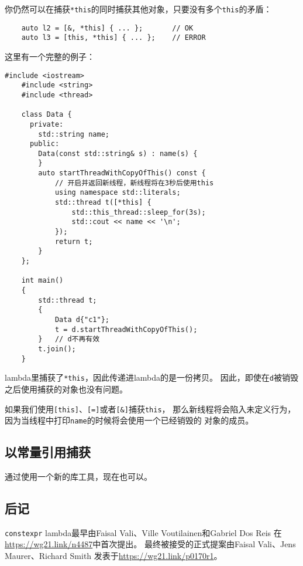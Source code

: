 你仍然可以在捕获\texttt{*this}的同时捕获其他对象，只要没有多个\texttt{this}的矛盾：
\begin{lstlisting}
    auto l2 = [&, *this] { ... };       // OK
    auto l3 = [this, *this] { ... };    // ERROR
\end{lstlisting}
这里有一个完整的例子：
\begin{lstlisting}[frame=single, title=lang/lambdathis.cpp]
    #include <iostream>
    #include <string>
    #include <thread>

    class Data {
      private:
        std::string name;
      public:
        Data(const std::string& s) : name(s) {
        }
        auto startThreadWithCopyOfThis() const {
            // 开启并返回新线程，新线程将在3秒后使用this
            using namespace std::literals;
            std::thread t([*this] {
                std::this_thread::sleep_for(3s);
                std::cout << name << '\n';
            });
            return t;
        }
    };

    int main()
    {
        std::thread t;
        {
            Data d{"c1"};
            t = d.startThreadWithCopyOfThis();
        }   // d不再有效
        t.join();
    }
\end{lstlisting}
lambda里捕获了\texttt{*this}，因此传递进lambda的是一份拷贝。
因此，即使在\texttt{d}被销毁之后使用捕获的对象也没有问题。

如果我们使用\texttt{[this]}、\texttt{[=]}或者\texttt{[\&]}捕获\texttt{this}，
那么新线程将会陷入未定义行为，因为当线程中打印\texttt{name}的时候将会使用一个已经销毁的
对象的成员。

\subsection{以常量引用捕获}
通过使用一个新的库工具，现在也可以。

\subsection{后记}
\texttt{constexpr} lambda最早由Faisal Vali、Ville Voutilainen和Gabriel Dos Reis
在\url{https://wg21.link/n4487}中首次提出。
最终被接受的正式提案由Faisal Vali、Jens Maurer、Richard Smith
发表于\url{https://wg21.link/p0170r1}。